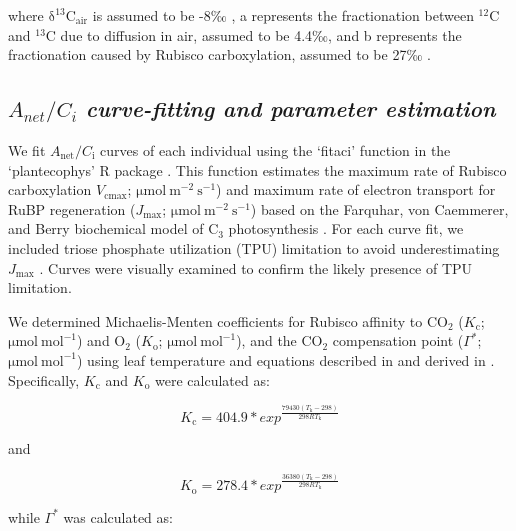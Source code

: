     \noindent where $\mathrm{\delta^{13}C_{air}}$ is assumed to be -8‰ , a represents the fractionation between $\mathrm{^{12}C}$ and $\mathrm{^{13}C}$ due to diffusion in air, assumed to be 4.4‰, and b represents the fractionation caused by Rubisco carboxylation, assumed to be 27‰ .
    
    \subsection{$A_{net}/C_i$ \textit{curve-fitting and parameter estimation}}

    We fit $A_\mathrm{{net}}/C_\mathrm{i}$ curves of each individual using the ‘fitaci’ function in the ‘plantecophys’ R package . This function estimates the maximum rate of Rubisco carboxylation $V_{\mathrm{cmax}}$; $\mathrm{\mu mol\ m^{-2}\ s^{-1}}$) and maximum rate of electron transport for RuBP regeneration ($J_{\mathrm{max}}$; $\mathrm{\mu mol\ m^{-2}\ s^{-1}}$) based on the Farquhar, von Caemmerer, and Berry biochemical model of C$_{3}$ photosynthesis . For each curve fit, we included triose phosphate utilization (TPU) limitation to avoid underestimating $J_{\mathrm{max}}$ . Curves were visually examined to confirm the likely presence of TPU limitation. 
    
    We determined Michaelis-Menten coefficients for Rubisco affinity to $\mathrm{CO_2}$ ($K_\mathrm{c}$; $\mathrm{\mu mol\ mol^{-1}}$) and $\mathrm{O_2}$ ($K_\mathrm{o}$; $\mathrm{\mu mol\ mol^{-1}}$), and the $\mathrm{CO_2}$ compensation point ($\Gamma^*$; $\mathrm{\mu mol\ mol^{-1}}$) using leaf temperature and equations described in  and derived in . Specifically, $K_\mathrm{c}$ and $K_\mathrm{o}$ were calculated as:

    \begin{equation} \label{eq_2.3}
        K_\mathrm{c}=404.9*exp^{\frac{79430(T_\mathrm{k}-298)}{298RT_\mathrm{k}}}
    \end{equation}
    
    \noindent and
    
    \begin{equation} \label{eq_2.4}
        K_\mathrm{o}=278.4*exp^{\frac{36380(T_\mathrm{k}-298)}{298RT_\mathrm{k}}}
    \end{equation}
    
    \noindent while $\Gamma^*$ was calculated as:
    
